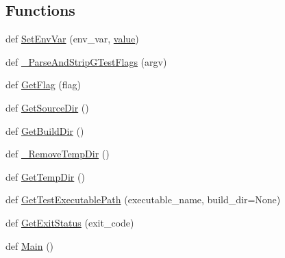 \subsection*{Functions}
\begin{DoxyCompactItemize}
\item 
def \mbox{\hyperlink{namespacegoogletest-master_1_1googletest_1_1test_1_1gtest__test__utils_a98c2298a9af2f408668f394fe2759587}{Set\+Env\+Var}} (env\+\_\+var, \mbox{\hyperlink{_obj__test_2lib_2googletest-master_2googlemock_2test_2gmock-matchers__test_8cc_a337b8a670efc0b086ad3af163f3121b6}{value}})
\item 
def \mbox{\hyperlink{namespacegoogletest-master_1_1googletest_1_1test_1_1gtest__test__utils_a8a23cf0aed6803aa166494ee4d4194ac}{\+\_\+\+Parse\+And\+Strip\+G\+Test\+Flags}} (argv)
\item 
def \mbox{\hyperlink{namespacegoogletest-master_1_1googletest_1_1test_1_1gtest__test__utils_a6e7b42296bb66f80f0e1108e7c31e3e7}{Get\+Flag}} (flag)
\item 
def \mbox{\hyperlink{namespacegoogletest-master_1_1googletest_1_1test_1_1gtest__test__utils_a5b2487a7b4864fb1c1fd6d5c283062ef}{Get\+Source\+Dir}} ()
\item 
def \mbox{\hyperlink{namespacegoogletest-master_1_1googletest_1_1test_1_1gtest__test__utils_aa627634af4273dc9a9a5dc521fe745be}{Get\+Build\+Dir}} ()
\item 
def \mbox{\hyperlink{namespacegoogletest-master_1_1googletest_1_1test_1_1gtest__test__utils_a17a34558d8d7327b9b8c0e9f3cf17f19}{\+\_\+\+Remove\+Temp\+Dir}} ()
\item 
def \mbox{\hyperlink{namespacegoogletest-master_1_1googletest_1_1test_1_1gtest__test__utils_a2710dd8832dbb21fab8283e6b997f63c}{Get\+Temp\+Dir}} ()
\item 
def \mbox{\hyperlink{namespacegoogletest-master_1_1googletest_1_1test_1_1gtest__test__utils_a78bbc69ac699e750a6a29188caa643c4}{Get\+Test\+Executable\+Path}} (executable\+\_\+name, build\+\_\+dir=None)
\item 
def \mbox{\hyperlink{namespacegoogletest-master_1_1googletest_1_1test_1_1gtest__test__utils_a33b857c245336dc42604a941dbecc15d}{Get\+Exit\+Status}} (exit\+\_\+code)
\item 
def \mbox{\hyperlink{namespacegoogletest-master_1_1googletest_1_1test_1_1gtest__test__utils_a09393458111e351256e56556175f31be}{Main}} ()
\end{DoxyCompactItemize}
